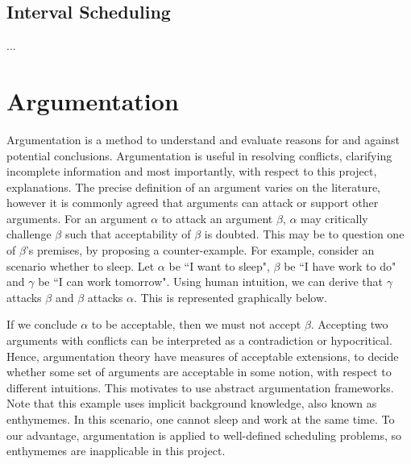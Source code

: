 \subsection{Interval Scheduling}

...

\section{Argumentation}

Argumentation is a method to understand and evaluate reasons for and against potential conclusions. Argumentation is useful in resolving conflicts, clarifying incomplete information and most importantly, with respect to this project, explanations. The precise definition of an argument varies on the literature, however it is commonly agreed that arguments can attack or support other arguments. For an argument $\alpha$ to attack an argument $\beta$, $\alpha$ may critically challenge $\beta$ such that acceptability of $\beta$ is doubted.\cite{at} This may be to question one of $\beta$'s premises, by proposing a counter-example. For example, consider an scenario whether to sleep. Let $\alpha$ be ``I want to sleep", $\beta$ be ``I have work to do" and $\gamma$ be ``I can work tomorrow". Using human intuition, we can derive that $\gamma$ attacks $\beta$ and $\beta$ attacks $\alpha$. This is represented graphically below.

\begin{center}
\end{center}

If we conclude $\alpha$ to be acceptable, then we must not accept $\beta$. Accepting two arguments with conflicts can be interpreted as a contradiction or hypocritical. Hence, argumentation theory have measures of acceptable extensions, to decide whether some set of arguments are acceptable in some notion, with respect to different intuitions. This motivates to use abstract argumentation frameworks.\linespace
Note that this example uses implicit background knowledge, also known as enthymemes. In this scenario, one cannot sleep and work at the same time. To our advantage, argumentation is applied to well-defined scheduling problems, so enthymemes are inapplicable in this project.

